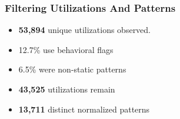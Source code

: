 



{
\begin{frame}
\frametitle{Filtering Utilizations And Patterns}
\begin{itemize}
\item [] \textbf{53,894} unique utilizations observed.
\item [] \begin{footnotesize}12.7\% use behavioral flags\end{footnotesize}
\item [] \begin{footnotesize}6.5\% were non-static patterns\end{footnotesize}
\item [] \textbf{43,525} utilizations remain
\item [] \textbf{13,711} distinct normalized patterns

\end{itemize}
\end{frame}}

